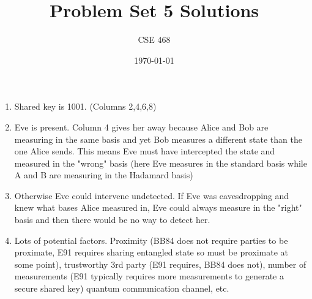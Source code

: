\documentclass[12pt]{article}
\title{Problem Set 5 Solutions}
\author{CSE 468}
\date{\today}
\begin{document}
\maketitle

\begin{enumerate}[font=\bfseries]
    \item Shared key is 1001. (Columns 2,4,6,8)
    \item Eve is present. Column 4 gives her away because Alice and Bob are measuring in the same basis and yet Bob measures a different state than the one Alice sends. This means Eve must have intercepted the state and measured in the "wrong" basis (here Eve measures in the standard basis while A and B are measuring in the Hadamard basis)
    \item Otherwise Eve could intervene undetected. If Eve was eavesdropping and knew what bases Alice measured in, Eve could always measure in the "right" basis and then there would be no way to detect her.
    \item Lots of potential factors. Proximity (BB84 does not require parties to be proximate, E91 requires sharing entangled state so must be proximate at some point), trustworthy 3rd party (E91 requires, BB84 does not), number of measurements (E91 typically requires more measurements to generate a secure shared key) quantum communication channel, etc. 

\end{enumerate}
\end{document}
